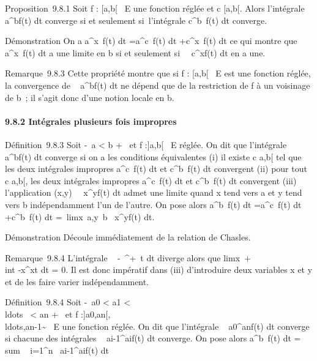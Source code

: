 Proposition~9.8.1 Soit f : {[}a,b{[}\rightarrow~ E une fonction réglée et c \in
{[}a,b{[}. Alors l'intégrale \int ~
a^bf(t) dt converge si et seulement si~l'intégrale
\int  c^b~f(t) dt converge.

Démonstration On a \int  a^x~f(t)
dt =\int  a^c~f(t) dt
+\int  c^x~f(t) dt ce qui montre
que \int  a^x~f(t) dt a une
limite en b si et seulement si~\int ~
c^xf(t) dt en a une.

Remarque~9.8.3 Cette propriété montre que si f : {[}a,b{[}\rightarrow~ E est une
fonction réglée, la convergence de \int ~
a^bf(t) dt ne dépend que de la restriction de f à un
voisinage de b~; il s'agit donc d'une notion locale en b.

\paragraph{9.8.2 Intégrales plusieurs fois impropres}

Définition~9.8.3 Soit -\infty~\leq a \textless{} b \leq +\infty~ et f :{]}a,b{[}\rightarrow~ E
réglée. On dit que l'intégrale \int ~
a^bf(t) dt converge si on a les conditions équivalentes
(i) il existe c \in{]}a,b{[} tel que les deux intégrales impropres
\int  a^c~f(t) dt et
\int  c^b~f(t) dt convergent (ii)
pour tout c \in{]}a,b{[}, les deux intégrales impropres
\int  a^c~f(t) dt et
\int  c^b~f(t) dt convergent
(iii) l'application
(x,y)\mapsto~\int ~
x^yf(t) dt admet une limite quand x tend vers a et y tend
vers b indépendamment l'un de l'autre. On pose alors
\int  a^b~f(t) dt
=\int  a^c~f(t) dt
+\int  c^b~f(t) dt
=\
limx\rightarrow~a,y\rightarrow~b\int ~
x^yf(t) dt.

Démonstration Découle immédiatement de la relation de Chasles.

Remarque~9.8.4 L'intégrale \int ~
-\infty~^+\infty~t dt diverge alors que
limx\rightarrow~+\infty~~\\int
 -x^xt dt = 0. Il est donc impératif dans (iii)
d'introduire deux variables x et y et de les faire varier
indépendamment.

Définition~9.8.4 Soit -\infty~\leq a0 \textless{} a1
\textless{} \\ldots~
\textless{} an \leq +\infty~ et f
:{]}a0,an{[}\diagdown{},\\ldots,an-1\~
\rightarrow~ E une fonction réglée. On dit que l'intégrale
\int ~
a0^anf(t) dt converge si chacune des
intégrales \int ~
ai-1^aif(t) dt converge. On pose
alors \int  a^b~f(t) dt
= \\sum ~
i=1^n\int ~
ai-1^aif(t) dt

